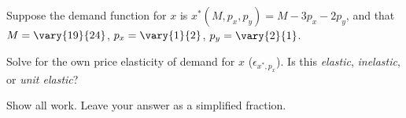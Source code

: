 \begin{question}[type=exam]{8}
  Suppose the demand function for $x$ is $x^*(M,p_x,p_y) = M - 3 p_x - 2 p_y$,
  and that $M = \vary{19}{24}$, $p_x = \vary{1}{2}$, $p_y = \vary{2}{1}$.

  Solve for the own price elasticity of demand for $x$
  ($\epsilon_{x^*,p_x}$).
  Is this \textit{elastic}, \textit{inelastic}, or \textit{unit elastic}?

  Show all work. Leave your answer as a simplified fraction.
\end{question}

